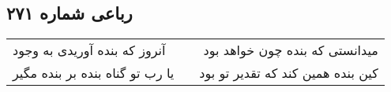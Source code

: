 \begin{center}
\section*{رباعی شماره ۲۷۱}
\label{sec:sh271}
\begin{longtable}{l p{0.5cm} r}
آنروز که بنده آوریدی به وجود
&&
میدانستی که بنده چون خواهد بود
\\
یا رب تو گناه بنده بر بنده مگیر
&&
کین بنده همین کند که تقدیر تو بود
\\
\end{longtable}
\end{center}
